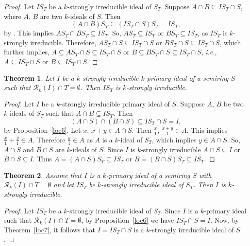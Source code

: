 \documentclass[11pt,leqno]{amsart}
\newtheorem{theorem}{Theorem}[section]
\theoremstyle{definition}
\numberwithin{equation}{section}
\begin{document}
\begin{proof}
Let $IS_T$ be a $k$-strongly irreducible ideal of $S_T$. Suppose $A\cap B\subseteq IS_T\cap S$, where $A$, $B$ are two $k$-ideals of $S$. Then \[(A\cap B)S_T\subseteq (IS_T\cap S)S_T=IS_T,\] by \cite[Lemma 4]{Atani08}. This implies $AS_T\cap BS_T\subseteq IS_T$. So, $AS_T\subseteq IS_T$ or $BS_T\subseteq IS_T$, as $IS_T$ is $k$-strongly irreducible. Therefore, $AS_T\cap S\subseteq IS_T\cap S$ or $BS_T\cap S\subseteq IS_T\cap S$, which further implies, $A\subseteq AS_T\cap S\subseteq IS_T\cap S$ or $B\subseteq BS_T\cap S\subseteq IS_T\cap S$,  \textit{i.e.}, $A\subseteq IS_T\cap S$ or $B\subseteq IS_T\cap S$. 	
\end{proof}

\begin{theorem}
Let $I$ be a $k$-strongly irreducible $k$-primary ideal of a semiring $S$ such that
$\mathcal{R}_k(I) \cap T = \emptyset$. Then $IS_T$ is $k$-strongly irreducible.
\end{theorem}

\begin{proof}
Let $I$ be a $k$-strongly irreducible primary ideal of $S$. Suppose $A$, $B$ be two $k$-ideals of $S_T$ such that $A\cap B \subseteq IS_T$. Then \[(A\cap S)\cap (B\cap S)\subseteq IS_T\cap S=I,\] by Proposition~\ref{loc6}. Let $x$, $x+y\in A\cap S$. Then $\frac{x}{1}$, $\frac{x+y}{1}\in A$. This implies $\frac{x}{1}+\frac{y}{1} \in A$. Therefore $\frac{y}{1}\in A$ as $A$ is a $k$-ideal of $S_T$, which implies $y\in A\cap S$. So, $A\cap S$ and $B\cap S$ are $k$-ideals of $S$. Since $I$ is $k$-strongly irreducible $A\cap S\subseteq I$ or $B\cap S\subseteq I$. Thus $A=(A\cap S)S_T\subseteq IS_T$ or $B=(B\cap S)S_T\subseteq IS_T$.		
\end{proof}

\begin{theorem}
Assume that $I$ is a $k$-primary ideal of a semiring $S$ with $\mathcal{R}_k(I) \cap T = \emptyset$
and let $IS_T$ be $k$-strongly irreducible ideal of $S_T$. Then $I$ is $k$-strongly irreducible.
\end{theorem}

\begin{proof}
Let $IS_T$ be a $k$-strongly irreducible ideal of $S_T$. Since $I$ is a $k$-primary ideal such that $\mathcal{R}_k(I)\cap T=\emptyset$, by Proposition~\ref{loc6} we have $IS_T\cap S=I$. Now, by Theorem~\ref{loc7}, it follows that $I=IS_T\cap S$ is a $k$-strongly irreducible ideal of $S$.		
\end{proof}
\end{document}
